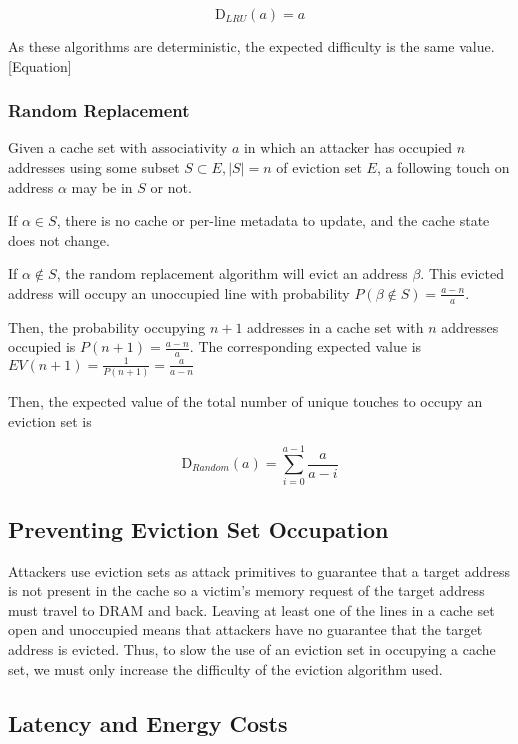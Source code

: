 \begin{equation}
    \text{D}_{LRU}(a)=a
\end{equation}

As these algorithms are deterministic, the expected difficulty is the same value.
[Equation]

\subsubsection{Random Replacement}
Given a cache set with associativity $a$ in which an attacker has occupied $n$ addresses using some subset $S \subset E, |S| = n$ of eviction set $E$, a following touch on address $\alpha$ may be in $S$ or not.

If $\alpha \in S$, there is no cache or per-line metadata to update, and the cache state does not change.

If $\alpha \notin S$, the random replacement algorithm will evict an address $\beta$.
This evicted address will occupy an unoccupied line with probability
$P(\beta \notin S) = \frac{a-n}{a}$.

Then, the probability occupying $n+1$ addresses in a cache set with $n$ addresses occupied is $P(n+1) = \frac{a-n}{a}$.
The corresponding expected value is $EV(n+1) = \frac{1}{P(n+1)} = \frac{a}{a-n}$

Then, the expected value of the total number of unique touches to occupy an eviction set is

\begin{equation}
    \text{D}_{Random}(a) = \sum_{i=0}^{a-1}{\frac{a}{a-i}}
\end{equation}

\subsection{Preventing Eviction Set Occupation}
Attackers use eviction sets as attack primitives to guarantee that a target address is not present in the cache
so a victim's memory request of the target address must travel to DRAM and back.
Leaving at least one of the lines in a cache set open and unoccupied means that attackers have no guarantee that the target address is evicted.
Thus, to slow the use of an eviction set in occupying a cache set, we must only increase the difficulty of the eviction algorithm used.

\subsection{Latency and Energy Costs}

